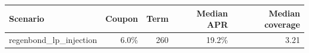 \begingroup
\small
\setlength{\tabcolsep}{3pt}
\begin{tabular}{lrrrr}
\toprule
Scenario & Coupon & Term & Median APR & Median coverage \\
\midrule
regenbond\_lp\_injection & 6.0\% & 260 & 19.2\% & 3.21 \\
\bottomrule
\end{tabular}
\endgroup
